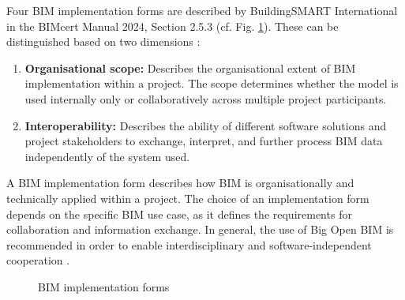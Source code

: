 \begin{English}
    Four BIM implementation forms are described by BuildingSMART International in the BIMcert Manual 2024, Section 2.5.3 (cf. Fig. \ref{fig:BIM_use_cases}). These can be distinguished based on two dimensions \cite{astourLehrbuchGrundlagenBIMArbeitsmethode2022}:
    
    \begin{enumerate}
        \item \textbf{Organisational scope:} Describes the organisational extent of BIM implementation within a project. The scope determines whether the model is used internally only or collaboratively across multiple project participants.
        \item \textbf{Interoperability:} Describes the ability of different software solutions and project stakeholders to exchange, interpret, and further process BIM data independently of the system used.
    \end{enumerate}

    A BIM implementation form describes how BIM is organisationally and technically applied within a project. The choice of an implementation form depends on the specific BIM use case, as it defines the requirements for collaboration and information exchange.
    In general, the use of Big Open BIM is recommended in order to enable interdisciplinary and software-independent cooperation \cite{astourLehrbuchGrundlagenBIMArbeitsmethode2022}.
\end{English}
\setlength{\parindent}{\oldparindent}

\begin{figure}[h]
    \centering
    \caption{BIM implementation forms}
    \label{fig:BIM_use_cases}
\end{figure}



